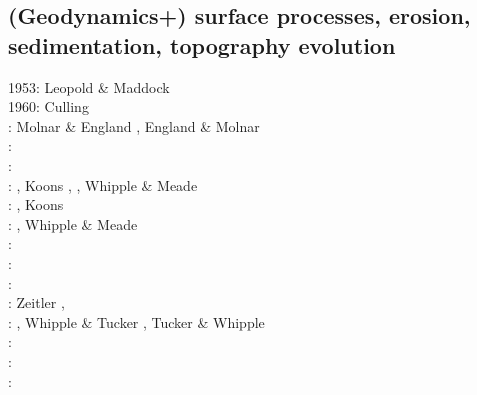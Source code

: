 \subsection{(Geodynamics+) surface processes, erosion, sedimentation, topography evolution}

\begin{scriptsize}
1953: Leopold \& Maddock \cite{lema53}\\
1960: Culling \cite{cull60}\\
\nineteenninety: Molnar \& England \cite{moen90}, England \& Molnar \cite{enmo90}\\
\nineteenninetytwo: \cite{befh92}\cite{chas92}\\
\nineteenninetythree: \cite{povp93}\cite{wibf93}\\
\nineteenninetyfour: \cite{howa94}, Koons \cite{koon94}, \cite{kobe94}\cite{gikb94}, 
                     Whipple \& Meade \cite{whme04}\\
\nineteenninetyfive: \cite{chmm95}, Koons \cite{koon95}\\
\nineteenninetysix: \cite{avbu96}\cite{bekh96}\cite{kobe96},
                     Whipple \& Meade \cite{whme06}\\
\nineteenninetyseven: \cite{brsa97}\cite{gaft97}\cite{babr97}\\
\nineteenninetyeight: \cite{deea98}\cite{vabr98}\\
\nineteenninetynine: \cite{will99a}\cite{bupi99}\cite{babr99}\cite{tobr99}\\
\twothousandone: Zeitler \etal \cite{zemk01}, \cite{tulg01}
                 \cite{brsh01}\cite{bupo01}\cite{coul01}\cite{crda01}\cite{moln01}\\
\twothousandtwo: \cite{wibr02}\cite{mobr02}\cite{garc02}, Whipple \& Tucker \cite{whtu02}, 
                 Tucker \& Whipple \cite{tuwh02}\\
\twothousandthree:    \cite{brau03}\\
\twothousandfour:     \cite{fijj04}\cite{gocl04}\cite{simp04}\cite{skdi04}\\
\twothousandfive:     \cite{lave05}\cite{will05}\cite{lahd05}\\

\end{scriptsize}
